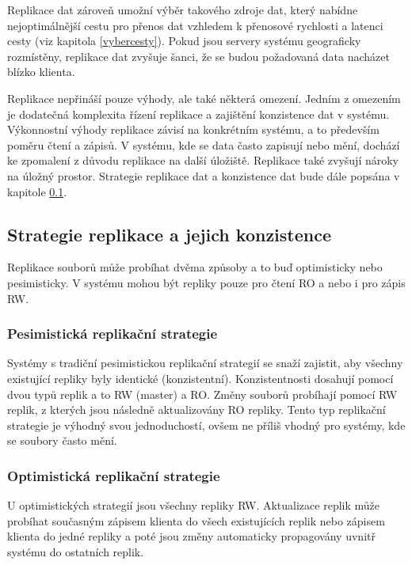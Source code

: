 \documentclass[czech,DP]{thesiskiv}
\begin{document}
Replikace dat zároveň umožní výběr takového zdroje dat, který nabídne nejoptimálnější cestu pro přenos dat vzhledem k přenosové rychlosti a latenci cesty (viz kapitola \ref{vybercesty}). Pokud jsou servery systému geograficky rozmístěny, replikace dat zvyšuje šanci, že se budou požadovaná data nacházet blízko klienta.

Replikace nepřináší pouze výhody, ale také některá omezení. Jedním z omezením je dodatečná komplexita řízení replikace a zajištění konzistence dat v systému. Výkonnostní výhody replikace závisí na konkrétním systému, a to především poměru čtení a zápisů. V systému, kde se data často zapisují nebo mění, dochází ke zpomalení z důvodu replikace na další úložiště. Replikace také zvyšují nároky na úložný prostor. Strategie replikace dat a konzistence dat bude dále popsána v kapitole 
\ref{strategiereplikace}.

\subsection{Strategie replikace a jejich konzistence} \label{strategiereplikace}

Replikace souborů může probíhat dvěma způsoby a to buď optimisticky nebo pesimisticky. V systému mohou být repliky pouze pro čtení RO a nebo i pro zápis RW.

\subsubsection*{Pesimistická replikační strategie} 

Systémy s tradiční pesimistickou replikační strategií se snaží zajistit, aby všechny existující repliky byly identické (konzistentní). Konzistentnosti dosahují pomocí dvou typů replik a to RW (master) a RO. Změny souborů probíhají pomocí RW replik, z kterých jsou následně aktualizovány RO repliky. Tento typ replikační strategie je výhodný svou jednoduchostí, ovšem ne příliš vhodný pro systémy, kde se soubory často mění.

\subsubsection*{Optimistická replikační strategie}

U optimistických strategií jsou všechny repliky RW. Aktualizace replik může probíhat současným zápisem klienta do všech existujících replik nebo zápisem klienta do jedné repliky a poté jsou změny automaticky propagovány uvnitř systému do ostatních replik.
\end{document}
